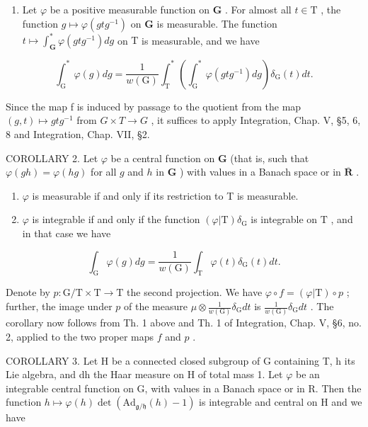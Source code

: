 \begin{enumerate}
\def\labelenumi{(\roman{enumi})}
\setcounter{enumi}{1}
\tightlist
\item
  Let \(\varphi\) be a positive measurable function on \(\mathbf{G}\) . For almost all \(t \in \mathrm{T}\) , the function \(g \mapsto \varphi(gtg^{-1})\) on \(\mathbf{G}\) is measurable. The function \(t \mapsto \int_{\mathbf{G}}^{*} \varphi(gtg^{-1}) dg\) on \(\mathrm{T}\) is measurable, and we have
\end{enumerate}

\[
\int_ {\mathrm{G}} ^ {*} \varphi (g) d g = \frac {1}{w (\mathrm{G})} \int_ {\mathrm{T}} ^ {*} \left(\int_ {\mathrm{G}} ^ {*} \varphi (g t g ^ {- 1}) d g\right) \delta_ {\mathrm{G}} (t) d t.\tag{5}
\]

Since the map f is induced by passage to the quotient from the map \((g, t) \mapsto gtg^{-1}\) from \(G \times T \to G\) , it suffices to apply Integration, Chap. V, §5, 6, 8 and Integration, Chap. VII, §2.

COROLLARY 2. Let \(\varphi\) be a central function on \(\mathbf{G}\) (that is, such that \(\varphi(gh) = \varphi(hg)\) for all \(g\) and \(h\) in \(\mathbf{G}\) ) with values in a Banach space or in \(\overline{\mathbf{R}}\) .

\begin{enumerate}
\def\labelenumi{\alph{enumi})}
\item
  \(\varphi\) is measurable if and only if its restriction to T is measurable.
\item
  \(\varphi\) is integrable if and only if the function \((\varphi |\mathrm{T})\delta_{\mathrm{G}}\) is integrable on \(\mathrm{T}\) , and in that case we have
\end{enumerate}

\[
\int_ {\mathrm{G}} \varphi (g) d g = \frac {1}{w (\mathrm{G})} \int_ {\mathrm{T}} \varphi (t) \delta_ {\mathrm{G}} (t) d t.\tag{6}
\]

Denote by \(p: \mathrm{G} / \mathrm{T} \times \mathrm{T} \to \mathrm{T}\) the second projection. We have \(\varphi \circ f = (\varphi | \mathrm{T}) \circ p\) ; further, the image under \(p\) of the measure \(\mu \otimes \frac{1}{w(\mathrm{G})} \delta_{\mathrm{G}} dt\) is \(\frac{1}{w(\mathrm{G})} \delta_{\mathrm{G}} dt\) . The corollary now follows from Th. 1 above and Th. 1 of Integration, Chap. V, §6, no. 2, applied to the two proper maps \(f\) and \(p\) .

COROLLARY 3. Let H be a connected closed subgroup of G containing T, h its Lie algebra, and dh the Haar measure on H of total mass 1. Let \(\varphi\) be an integrable central function on G, with values in a Banach space or in R. Then the function \(h \mapsto \varphi(h) \det(\mathrm{Ad}_{\mathfrak{g}/\mathfrak{h}}(h) - 1)\) is integrable and central on H and we have

